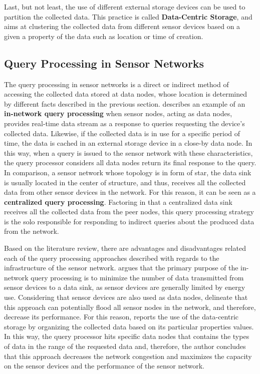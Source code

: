Last, but not least, the use of different external storage devices can be used
to partition the collected data. This practice is called \textbf{Data-Centric
Storage}, and aims at clustering the collected data from different sensor
devices based on a given a property of the data such as location or time of
creation.

\subsection{Query Processing in Sensor Networks}
\label{sec:query-process}

The query processing in sensor networks is a direct or indirect method of
accessing the collected data stored at data nodes, whose location is determined
by different facts described in the previous section. \cite{sn-storage03}
describes an example of an \textbf{in-network query processing} when sensor
nodes, acting as data nodes, provides real-time data stream as a response
to queries requesting the device's collected data. Likewise, if the collected
data is in use for a specific period of time, the data is cached in an external
storage device in a close-by data node. In this way, when a query is issued to
the sensor network with these characteristics, the query processor considers 
all data nodes return its final response to the query. In comparison, a sensor
network whose topology is in form of star, the data sink is usually located in
the center of structure, and thus, receives all the collected data from other
sensor devices in the network. For this reason, it can be seen as a 
\textbf{centralized query processing}. Factoring in that a centralized data
sink receives all the collected data from the peer nodes, this query processing
strategy is the solo responsible for responding to indirect queries about the
produced data from the network. 

Based on the literature review, there are advantages and disadvantages related
each of the query processing approaches described with regards to the
infrastructure of the sensor network. \cite{sn-storage03} argues that the 
primary purpose of the in-network query processing is to minimize the number
of data transmitted from sensor devices to a data sink, as sensor devices are
generally limited by energy use. Considering that sensor devices are also used
as data nodes, \cite{sn-storage04} delineate that this approach can potentially
flood all sensor nodes in the network, and therefore, decrease its performance.
For this reason, \cite{sn-storage01} reports the use of the data-centric
storage by organizing the collected data based on its particular properties
values. In this way, the query processor hits specific data nodes that contains
the types of data in the range of the requested data and, therefore, the author
concludes that this approach decreases the network congestion and maximizes the
capacity on the sensor devices and the performance of the sensor network.

